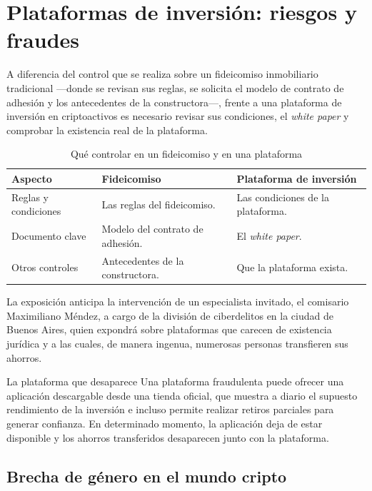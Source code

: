 \documentclass[12pt,oneside]{book}
\begin{document}
\section{Plataformas de inversión: riesgos y fraudes}

A diferencia del control que se realiza sobre un fideicomiso inmobiliario tradicional —donde se revisan sus reglas, se solicita el modelo de contrato de adhesión y los antecedentes de la constructora—, frente a una plataforma de inversión en criptoactivos es necesario revisar sus condiciones, el \textit{white paper} y comprobar la existencia real de la plataforma.

\begin{table}[H]
\centering
\caption{Qué controlar en un fideicomiso y en una plataforma}
\begin{tabular}{p{}p{}p{}}
\toprule
\textbf{Aspecto} & \textbf{Fideicomiso} & \textbf{Plataforma de inversión} \\
\midrule
Reglas y condiciones & Las reglas del fideicomiso. & Las condiciones de la plataforma. \\
Documento clave & Modelo del contrato de adhesión. & El \textit{white paper}. \\
Otros controles & Antecedentes de la constructora. & Que la plataforma exista. \\
\bottomrule
\end{tabular}
\end{table}

La exposición anticipa la intervención de un especialista invitado, el comisario Maximiliano Méndez, a cargo de la división de ciberdelitos en la ciudad de Buenos Aires, quien expondrá sobre plataformas que carecen de existencia jurídica y a las cuales, de manera ingenua, numerosas personas transfieren sus ahorros.

\begin{example}{La plataforma que desaparece}
Una plataforma fraudulenta puede ofrecer una aplicación descargable desde una tienda oficial, que muestra a diario el supuesto rendimiento de la inversión e incluso permite realizar retiros parciales para generar confianza. En determinado momento, la aplicación deja de estar disponible y los ahorros transferidos desaparecen junto con la plataforma.
\end{example}

\subsection{Brecha de género en el mundo cripto}
\end{document}
